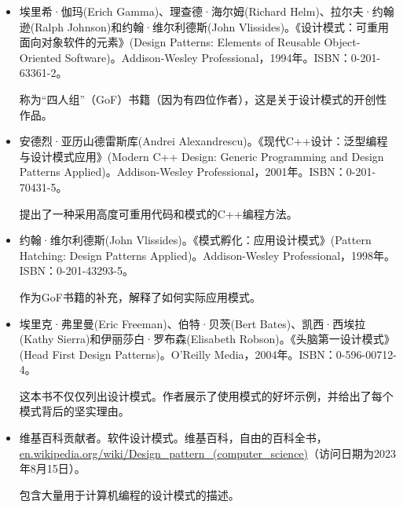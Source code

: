 
\begin{itemize}
\item
埃里希·伽玛(Erich Gamma)、理查德·海尔姆(Richard Helm)、拉尔夫·约翰逊(Ralph Johnson)和约翰·维尔利德斯(John Vlissides)。《设计模式：可重用面向对象软件的元素》(Design Patterns: Elements of Reusable Object-Oriented Software)。Addison-Wesley Professional，1994年。ISBN：0-201-63361-2。

\hspace*{\fill}

称为“四人组”（GoF）书籍（因为有四位作者），这是关于设计模式的开创性作品。

\hspace*{\fill}

\item
安德烈·亚历山德雷斯库(Andrei Alexandrescu)。《现代C++设计：泛型编程与设计模式应用》(Modern C++ Design: Generic Programming and Design Patterns Applied)。Addison-Wesley Professional，2001年。ISBN：0-201-70431-5。

\hspace*{\fill}

提出了一种采用高度可重用代码和模式的C++编程方法。

\hspace*{\fill}

\item
约翰·维尔利德斯(John Vlissides)。《模式孵化：应用设计模式》(Pattern Hatching: Design Patterns Applied)。Addison-Wesley Professional，1998年。ISBN：0-201-43293-5。

\hspace*{\fill}

作为GoF书籍的补充，解释了如何实际应用模式。

\hspace*{\fill}

\item
埃里克·弗里曼(Eric Freeman)、伯特·贝茨(Bert Bates)、凯西·西埃拉(Kathy Sierra)和伊丽莎白·罗布森(Elisabeth Robson)。《头脑第一设计模式》(Head First Design Patterns)。O’Reilly Media，2004年。ISBN：0-596-00712-4。

\hspace*{\fill}

这本书不仅仅列出设计模式。作者展示了使用模式的好坏示例，并给出了每个模式背后的坚实理由。

\hspace*{\fill}

\item
维基百科贡献者。软件设计模式。维基百科，自由的百科全书，\url{en.wikipedia.org/wiki/Design_pattern_(computer_science)}（访问日期为2023年8月15日）。

\hspace*{\fill}

包含大量用于计算机编程的设计模式的描述。
\end{itemize}


